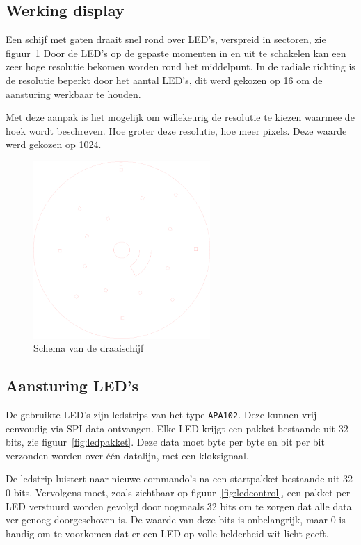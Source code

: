 \documentclass[12pt]{ugentreport}
\begin{document}
\subsection{Werking display}
Een schijf met gaten draait snel rond over LED's, verspreid in sectoren, zie figuur~\ref{fig:schijf}
Door de LED's op de gepaste momenten in en uit te schakelen
kan een zeer hoge resolutie bekomen worden rond het middelpunt.
In de radiale richting is de resolutie beperkt door het aantal LED's,
dit werd gekozen op 16 om de aansturing werkbaar te houden.

Met deze aanpak is het mogelijk om willekeurig de resolutie te kiezen
waarmee de hoek wordt beschreven. Hoe groter deze resolutie,
hoe meer pixels. Deze waarde werd gekozen op 1024.

\begin{figure}
  \centering
  \includegraphics[width=0.6\textwidth]{img/schijf.png}
  \caption{Schema van de draaischijf}
  \label{fig:schijf}
\end{figure}

\subsection{Aansturing LED's}
De gebruikte LED's zijn ledstrips van het type \texttt{APA102}.
Deze kunnen vrij eenvoudig via SPI data ontvangen.
Elke LED krijgt een pakket bestaande uit 32 bits, zie
figuur~\ref{fig:ledpakket}.
Deze data moet byte per byte en bit per bit verzonden worden over één datalijn,
met een kloksignaal.

De ledstrip luistert naar nieuwe commando's na een startpakket
bestaande uit 32 0-bits. Vervolgens moet,
zoals zichtbaar op figuur~\ref{fig:ledcontrol},
een pakket per LED verstuurd worden gevolgd door
nogmaals 32 bits om te zorgen dat alle data ver genoeg doorgeschoven is.
De waarde van deze bits is onbelangrijk,
maar 0 is handig om te voorkomen dat er een LED op volle helderheid wit licht geeft.
\end{document}
